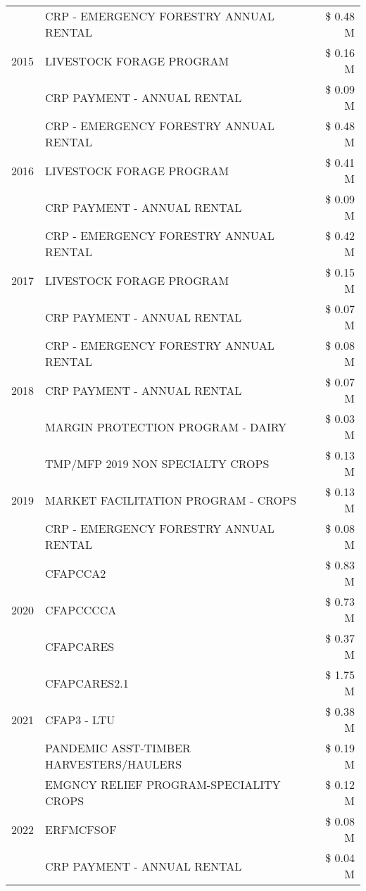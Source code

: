 \begin{tabular}{llr}
\cline{1-3}
\multirow[t]{3}{*}{2015} & CRP - EMERGENCY FORESTRY ANNUAL RENTAL & \$ 0.48 M \\
 & LIVESTOCK FORAGE PROGRAM & \$ 0.16 M \\
 & CRP PAYMENT - ANNUAL RENTAL & \$ 0.09 M \\
\cline{1-3}
\multirow[t]{3}{*}{2016} & CRP - EMERGENCY FORESTRY ANNUAL RENTAL & \$ 0.48 M \\
 & LIVESTOCK FORAGE PROGRAM & \$ 0.41 M \\
 & CRP PAYMENT - ANNUAL RENTAL & \$ 0.09 M \\
\cline{1-3}
\multirow[t]{3}{*}{2017} & CRP - EMERGENCY FORESTRY ANNUAL RENTAL & \$ 0.42 M \\
 & LIVESTOCK FORAGE PROGRAM & \$ 0.15 M \\
 & CRP PAYMENT - ANNUAL RENTAL & \$ 0.07 M \\
\cline{1-3}
\multirow[t]{3}{*}{2018} & CRP - EMERGENCY FORESTRY ANNUAL RENTAL & \$ 0.08 M \\
 & CRP PAYMENT - ANNUAL RENTAL & \$ 0.07 M \\
 & MARGIN PROTECTION PROGRAM - DAIRY & \$ 0.03 M \\
\cline{1-3}
\multirow[t]{3}{*}{2019} & TMP/MFP 2019 NON SPECIALTY CROPS & \$ 0.13 M \\
 & MARKET FACILITATION PROGRAM - CROPS & \$ 0.13 M \\
 & CRP - EMERGENCY FORESTRY ANNUAL RENTAL & \$ 0.08 M \\
\cline{1-3}
\multirow[t]{3}{*}{2020} & CFAPCCA2 & \$ 0.83 M \\
 & CFAPCCCCA & \$ 0.73 M \\
 & CFAPCARES & \$ 0.37 M \\
\cline{1-3}
\multirow[t]{3}{*}{2021} & CFAPCARES2.1 & \$ 1.75 M \\
 & CFAP3 - LTU & \$ 0.38 M \\
 & PANDEMIC ASST-TIMBER HARVESTERS/HAULERS & \$ 0.19 M \\
\cline{1-3}
\multirow[t]{3}{*}{2022} & EMGNCY RELIEF PROGRAM-SPECIALITY CROPS & \$ 0.12 M \\
 & ERFMCFSOF & \$ 0.08 M \\
 & CRP PAYMENT - ANNUAL RENTAL & \$ 0.04 M \\
\cline{1-3}
\bottomrule
\end{tabular}

